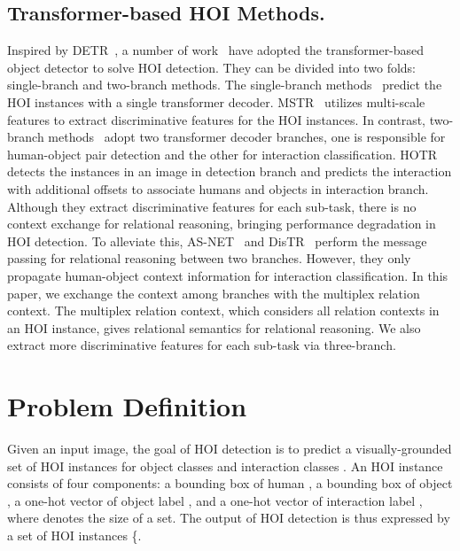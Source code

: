 \documentclass[10pt,twocolumn,letterpaper]{article}
\begin{document}
\subsection{Transformer-based HOI Methods.} 
Inspired by DETR~\cite{detr}, a number of work~\cite{zhou2022distr,zou2021hoitrans,chen2021asnet,tamura2021qpic,kim2022mstr,zhang2022upt,kim2021hotr} have adopted the transformer-based object detector to solve HOI detection. 
They can be divided into two folds: single-branch and two-branch methods.
The single-branch methods~\cite{tamura2021qpic,kim2022mstr,zou2021hoitrans} predict the HOI instances with a single transformer decoder.
MSTR~\cite{tamura2021qpic} utilizes multi-scale features to extract discriminative features for the HOI instances.
In contrast, two-branch methods~\cite{kim2021hotr,chen2021asnet,zhou2022distr,zhang2022upt,zhang2021cdn} adopt two transformer decoder branches, one is responsible for human-object pair detection and the other for interaction classification.
HOTR~\cite{kim2021hotr} detects the instances in an image in detection branch and predicts the interaction with additional offsets to associate humans and objects in interaction branch.
Although they extract discriminative features for each sub-task, there is no context exchange for relational reasoning, bringing performance degradation in HOI detection.
To alleviate this, AS-NET~\cite{chen2021asnet} and DisTR~\cite{zhou2022distr} perform the message passing for relational reasoning between two branches. 
However, they only propagate human-object context information for interaction classification.
In this paper, we exchange the context among branches with the multiplex relation context.
The multiplex relation context, which considers all relation contexts in an HOI instance, gives relational semantics for relational reasoning.
We also extract more discriminative features for each sub-task via three-branch.



 \section{Problem Definition}


Given an input image, the goal of HOI detection is to predict a visually-grounded set of HOI instances for object classes  and interaction classes . An HOI instance consists of four components: a bounding box of human , a bounding box of object , a one-hot vector of object label , and a one-hot
vector of interaction label , where  denotes the size of a set. The output of HOI detection is thus expressed by a set of HOI instances \{. 
\end{document}

